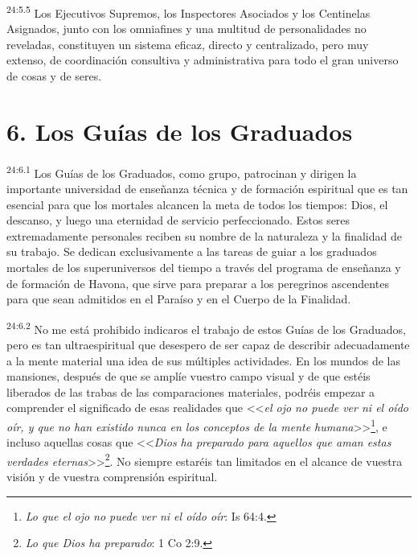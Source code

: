 \par
\textsuperscript{24:5.5} Los Ejecutivos Supremos, los Inspectores Asociados y los Centinelas Asignados, junto con los omniafines y una multitud de personalidades no reveladas, constituyen un sistema eficaz, directo y centralizado, pero muy extenso, de coordinación consultiva y administrativa para todo el gran universo de cosas y de seres.

\section*{6. Los Guías de los Graduados}
\par
\textsuperscript{24:6.1} Los Guías de los Graduados, como grupo, patrocinan y dirigen la importante universidad de enseñanza técnica y de formación espiritual que es tan esencial para que los mortales alcancen la meta de todos los tiempos: Dios, el descanso, y luego una eternidad de servicio perfeccionado. Estos seres extremadamente personales reciben su nombre de la naturaleza y la finalidad de su trabajo. Se dedican exclusivamente a las tareas de guiar a los graduados mortales de los superuniversos del tiempo a través del programa de enseñanza y de formación de Havona, que sirve para preparar a los peregrinos ascendentes para que sean admitidos en el Paraíso y en el Cuerpo de la Finalidad.

\par
\textsuperscript{24:6.2} No me está prohibido indicaros el trabajo de estos Guías de los Graduados, pero es tan ultraespiritual que desespero de ser capaz de describir adecuadamente a la mente material una idea de sus múltiples actividades. En los mundos de las mansiones, después de que se amplíe vuestro campo visual y de que estéis liberados de las trabas de las comparaciones materiales, podréis empezar a comprender el significado de esas realidades que <<\textit{el ojo no puede ver ni el oído oír, y que no han existido nunca en los conceptos de la mente humana}>>\footnote{\textit{Lo que el ojo no puede ver ni el oído oír}: Is 64:4.}, e incluso aquellas cosas que <<\textit{Dios ha preparado para aquellos que aman estas verdades eternas}>>\footnote{\textit{Lo que Dios ha preparado}: 1 Co 2:9.}. No siempre estaréis tan limitados en el alcance de vuestra visión y de vuestra comprensión espiritual.

